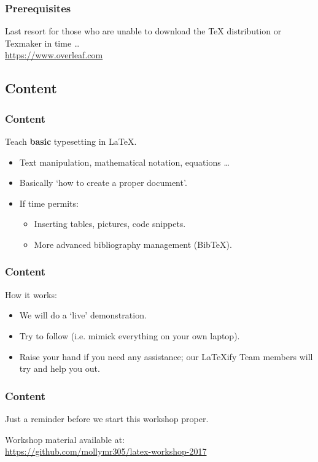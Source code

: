 \documentclass{beamer}
\begin{document}
    \begin{frame}
        \frametitle{Prerequisites}
        \begin{center}
            Last resort for those who are unable to download the \TeX{} distribution or Texmaker in time \dots\\[3mm]
            \url{https://www.overleaf.com}
        \end{center}
    \end{frame}

    \subsection{Content}
    \begin{frame}
        \frametitle{Content}
        Teach \textbf{basic} typesetting in \LaTeX.
        \begin{itemize}
            \item Text manipulation, mathematical notation, equations \dots
            \item Basically `how to create a proper document'.
            \item If time permits:
            \begin{itemize}
                \item Inserting tables, pictures, code snippets.
                \item More advanced bibliography management (BibTeX).
            \end{itemize}
        \end{itemize}
    \end{frame}

    \begin{frame}
        \frametitle{Content}
        How it works:
        \begin{itemize}
            \item We will do a `live' demonstration.
            \item Try to follow (i.e. mimick everything on your own laptop).
            \item Raise your hand if you need any assistance; our \LaTeX{}ify Team members will try and help you out.
        \end{itemize}
    \end{frame}

    \begin{frame}
        \frametitle{Content}
        Just a reminder before we start this workshop proper.
        \begin{center}
            Workshop material available at:\\[3mm]
            \url{https://github.com/mollymr305/latex-workshop-2017}
        \end{center}        
    \end{frame}
\end{document}
